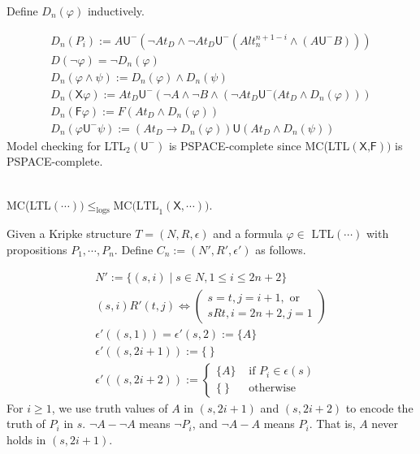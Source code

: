 \documentclass[12pt]{article}
\begin{document}
\begin{CJK*}{GBK}{song}
Define $D_n(\varphi)$ inductively.

$$\begin{array}{l}
D_n(P_i):=A\textsf{U}^-\left(\neg At_D\wedge \neg At_D\textsf{U}^-\left(Alt^{n+1-i}_n\wedge (A\textsf{U}^-B)\right)\right)\\
D(\neg \varphi)=\neg D_n(\varphi)\\
D_n(\varphi\wedge\psi):=D_n(\varphi)\wedge D_n(\psi)\\
D_n(\textsf{X}\varphi):=At_D\textsf{U}^-\left(\neg A\wedge\neg B\wedge\left(
\neg At_D\textsf{U}^-(At_D\wedge D_n(\varphi)\right)\right)\\
D_n(\textsf{F}\varphi):=F(At_D\wedge D_n(\varphi))\\
D_n(\varphi\textsf{U}^-\psi):=(At_D\rightarrow D_n(\varphi))\textsf{U}(At_D\wedge D_n(\psi))
\end{array}$$
%
\color{red} Model checking for LTL$_2(\textsf{U}^-)$ is PSPACE-complete since MC(LTL$(\textsf{X,F}))$ is PSPACE-complete.
\color{black}

\ \\

MC(LTL$(\cdots))\leq_{\text{logs}} \mbox{MC(LTL}_1(\textsf{X},\cdots))$.


Given a Kripke structure $T=(N,R,\epsilon)$ and a formula $\varphi\in \mbox{ LTL}(\cdots)$ with propositions $P_1,\cdots, P_n$. Define $C_n:=(N',R',\epsilon')$ as follows.

$$\begin{array}{l}
N':=\{(s,i)\mid s\in N, 1\leq i\leq 2n+2\}\\

(s,i)R'(t,j) \Longleftrightarrow \left(\begin{array}{l} s=t, j=i+1, \mbox{ or}\\
                                 sRt, i=2n+2, j=1
\end{array}\right)\\

\epsilon'((s,1))=\epsilon'(s,2):=\{A\}\\

\epsilon'((s,2i+1)):=\{ \ \}\\

\epsilon'((s,2i+2)):=\left\{\begin{array}{ll}
\{A\} & \mbox{ if }P_i\in \epsilon(s)\\
\{\ \} & \mbox{ otherwise }
\end{array}\right.
\end{array}
$$
%
For $i\geq 1$, we use truth values of $A$ in $(s,2i+1)$ and $(s,2i+2)$ to encode the truth of $P_i$ in $s$. $\neg A-\neg A$ means $\neg P_i$, and $\neg A-A$ means $P_i$. That is, $A$ never holds in $(s,2i+1)$.


\end{CJK*}
\end{document}
